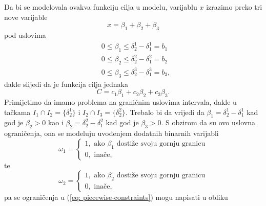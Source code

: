 \documentclass[a4paper, utf8, 11pt, colorlinks]{book}
\begin{document}
Da bi se modelovala ovakva funkciju cilja u modelu, varijablu $x$ izrazimo preko tri nove varijable 
$$x = \beta_1 + \beta_2 + \beta_3$$
pod uslovima 
\begin{align}
     &0   \leq \beta_1 \leq \delta^1_2 - \delta^1_1 = b_1 \nonumber \\
     &0  \leq \beta_2 \leq \delta^2_2 - \delta^2_1 = b_2 \nonumber \\
     &0  \leq \beta_3 \leq \delta^3_2- \delta^3_1 = b_3, \label{eq: piecewise-constraints}
\end{align}
dakle slijedi da je funkcija cilja   jednaka 
$$ C = c_1 \beta_1 + c_2 \beta_2 + c_3 \beta_3.$$ 
Primijetimo da imamo problema na graničnim uslovima intervala, dakle u tačkama $I_1 \cap I_2 =\{\delta^1_2\}$ i $I_2 \cap I_3 =\{\delta^2_2\}$. Trebalo bi da vrijedi da $\beta_1 =  \delta^1_2 - \delta^1_1$ kad god je $\beta_2  > 0$ kao i $\beta_2 =  \delta^2_2 - \delta^2_1$ kad god je $\beta_3  > 0$.  S obzirom da su ovo uslovna ograničenja, ona se modeluju uvođenjem dodatnih binarnih varijabli 
$$ \omega_1 = \begin{cases}
                   1, \mbox{ ako } \beta_1 \mbox{ dostiže svoju gornju granicu} \\
                   0, \mbox{ inače},
              \end{cases}$$
te 
$$ \omega_2 = \begin{cases}
                   1, \mbox{ ako } \beta_2 \mbox{ dostiže svoju gornju granicu} \\
                   0, \mbox{ inače}, 
              \end{cases}$$
pa se ograničenja u (\ref{eq: piecewise-constraints}) mogu napisati u obliku
\end{document}
